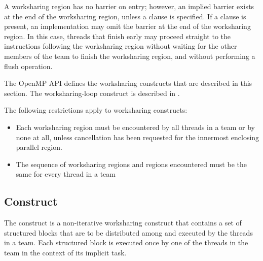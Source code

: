 A worksharing region has no barrier on entry; however, an implied barrier exists at the
end of the worksharing region, unless a  clause is specified. If a 
clause is present, an implementation may omit the barrier at the end of the worksharing
region. In this case, threads that finish early may proceed straight to the instructions
following the worksharing region without waiting for the other members of the team to
finish the worksharing region, and without performing a flush operation.

The OpenMP API defines the worksharing constructs that are described
in this section.  The worksharing-loop construct is described in .

\begin{samepage}
\restrictions
The following restrictions apply to worksharing constructs:

\begin{itemize}
\item Each worksharing region must be encountered by all threads in a team or by none at
all, unless cancellation has been requested for the innermost enclosing parallel
region.

\item The sequence of worksharing regions and  regions encountered must be the
same for every thread in a team
\end{itemize}
\end{samepage}











\subsection{ Construct}
\label{subsec:sections Construct}
\summary
The  construct is a non-iterative worksharing construct that contains a set of
structured blocks that are to be distributed among and executed by the threads in a team.
Each structured block is executed once by one of the threads in the team in the context
of its implicit task.


